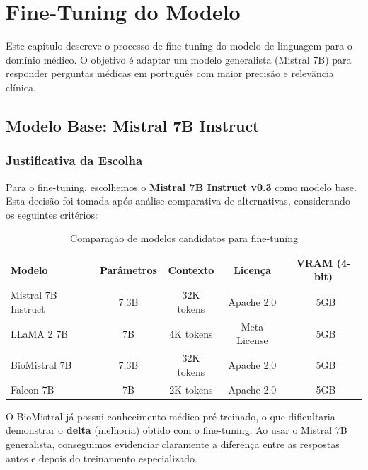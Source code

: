 
\chapter{Fine-Tuning do Modelo}
\label{cap:fine-tuning}

Este capítulo descreve o processo de fine-tuning do modelo de linguagem para o domínio médico. O objetivo é adaptar um modelo generalista (Mistral 7B) para responder perguntas médicas em português com maior precisão e relevância clínica.

\section{Modelo Base: Mistral 7B Instruct}
\label{sec:modelo-base}

\subsection{Justificativa da Escolha}

Para o fine-tuning, escolhemos o \textbf{Mistral 7B Instruct v0.3} como modelo base. Esta decisão foi tomada após análise comparativa de alternativas, considerando os seguintes critérios:

\begin{table}[H]
\centering
\caption{Comparação de modelos candidatos para fine-tuning}
\label{tab:comparacao-modelos}
\begin{tabular}{lcccc}
\toprule
\textbf{Modelo} & \textbf{Parâmetros} & \textbf{Contexto} & \textbf{Licença} & \textbf{VRAM (4-bit)} \\
\midrule
Mistral 7B Instruct & 7.3B & 32K tokens & Apache 2.0 & ~5GB \\
LLaMA 2 7B & 7B & 4K tokens & Meta License & ~5GB \\
BioMistral 7B & 7.3B & 32K tokens & Apache 2.0 & ~5GB \\
Falcon 7B & 7B & 2K tokens & Apache 2.0 & ~5GB \\
\bottomrule
\end{tabular}
\end{table}

\begin{importantbox}
O BioMistral já possui conhecimento médico pré-treinado, o que dificultaria demonstrar o \textbf{delta} (melhoria) obtido com o fine-tuning. Ao usar o Mistral 7B generalista, conseguimos evidenciar claramente a diferença entre as respostas antes e depois do treinamento especializado.
\end{importantbox}

